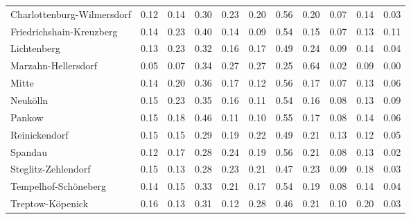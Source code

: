 \begin{longtable}{lrrrrrrrrrr}
\bottomrule
\endlastfoot
Charlottenburg-Wilmersdorf &           0.12 &        0.14 &        0.30 &        0.23 &          0.20 &             0.56 &  0.20 &           0.07 &                  0.14 &                  0.03 \\
Friedrichshain-Kreuzberg   &           0.14 &        0.23 &        0.40 &        0.14 &          0.09 &             0.54 &  0.15 &           0.07 &                  0.13 &                  0.11 \\
Lichtenberg                &           0.13 &        0.23 &        0.32 &        0.16 &          0.17 &             0.49 &  0.24 &           0.09 &                  0.14 &                  0.04 \\
Marzahn-Hellersdorf        &           0.05 &        0.07 &        0.34 &        0.27 &          0.27 &             0.25 &  0.64 &           0.02 &                  0.09 &                  0.00 \\
Mitte                      &           0.14 &        0.20 &        0.36 &        0.17 &          0.12 &             0.56 &  0.17 &           0.07 &                  0.13 &                  0.06 \\
Neukölln                   &           0.15 &        0.23 &        0.35 &        0.16 &          0.11 &             0.54 &  0.16 &           0.08 &                  0.13 &                  0.09 \\
Pankow                     &           0.15 &        0.18 &        0.46 &        0.11 &          0.10 &             0.55 &  0.17 &           0.08 &                  0.14 &                  0.06 \\
Reinickendorf              &           0.15 &        0.15 &        0.29 &        0.19 &          0.22 &             0.49 &  0.21 &           0.13 &                  0.12 &                  0.05 \\
Spandau                    &           0.12 &        0.17 &        0.28 &        0.24 &          0.19 &             0.56 &  0.21 &           0.08 &                  0.13 &                  0.02 \\
Steglitz-Zehlendorf        &           0.15 &        0.13 &        0.28 &        0.23 &          0.21 &             0.47 &  0.23 &           0.09 &                  0.18 &                  0.03 \\
Tempelhof-Schöneberg       &           0.14 &        0.15 &        0.33 &        0.21 &          0.17 &             0.54 &  0.19 &           0.08 &                  0.14 &                  0.04 \\
Treptow-Köpenick           &           0.16 &        0.13 &        0.31 &        0.12 &          0.28 &             0.46 &  0.21 &           0.10 &                  0.20 &                  0.03 \\
\end{longtable}
